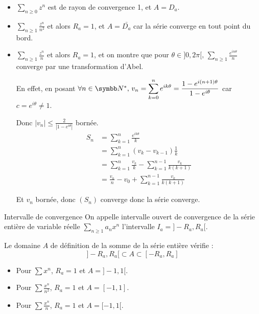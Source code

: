 \begin{exemple}
    \begin{itemize}
        \item $\sum_{n \geqslant 0} z^n$ est de rayon de convergence 1, et $A = D_a$.

        \item $\sum_{n \geqslant 1} \frac{z^n}{n^2}$ et alors $R_a = 1$, et $A = \bar{D_a}$ car la série converge en tout point du bord.

        \item $\sum_{n \geqslant 1} \frac{z^n} n$ et alors $R_a = 1$, et on montre que pour 
        $\theta \in ]0, 2 \pi[, \, \sum_{n \geqslant 1} \frac{e^{i n \theta}}{n}$ converge par une transformation d'Abel.

        En effet, en posant $\forall n \in \N^*, \, v_n = \displaystyle \sum_{k = 0 }^{n } e^{i k \theta} = \frac{1 - e^{i (n + 1) \theta}}{1 - e^{i \theta}}$
        car $c = e^{i \theta} \neq 1$. 
    
        Donc $\displaystyle \left| v_n \right| \leqslant \frac 2 {\left| 1 - e ^{i \theta} \right|}$ bornée.
        \begin{align*}
            S_n & = \sum_{k = 1}^n \frac{e^{i k \theta}} k \\
            & = \sum_{k = 1}^n \left(v_k - v_{k - 1}\right) \frac 1 k \\
            & = \sum_{k = 1}^n \frac{v_k} k - \sum_{k = 1}^{n - 1} \frac{v_k}{k(k + 1)}\\
            & = \frac{v_n} n - v_0 + \sum_{k = 1}^{n - 1} \frac{v_k}{k(k + 1)} 
        \end{align*}

        Et $v_n$ bornée, donc $(S_n)$ converge donc la série converge. 
    \end{itemize}
\end{exemple}

\begin{definition}{Intervalle de convergence}{}
    On appelle intervalle ouvert de convergence de la série entière de variable 
    réelle $\sum_{n \geqslant 1} a_n x^n$ l'intervalle $I_a = ]-R_a, R_a[$.

    Le domaine $A$ de définition de la somme de la série entière vérifie :
    \[] - R_a, R_a [ \subset A \subset [ - R_a, R_a ]\]
\end{definition}

\begin{exemple}
    \begin{itemize}
        \item Pour $\displaystyle \sum x^n$, $R_a = 1$ et $A = ]-1, 1[$.
        \item Pour $\displaystyle \sum \frac{x^n}{n^2}$, $R_a = 1$ et $A = [ -1, 1 ]$.
        \item Pour $\displaystyle \sum \frac{x^n}{n}$, $R_a = 1$ et $A = [ -1, 1 [ $.
    \end{itemize}
\end{exemple}

